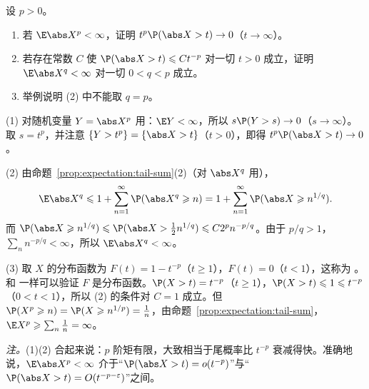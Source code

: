 \begin{workedexample}\label{we:expectation:moments-tails}
设 $p>0$。
\begin{enumerate}
\item 若 $\E\abs X^p<\infty$，证明 $t^p\P(\abs X>t)\to0$（$t\to\infty$）。
\item 若存在常数 $C$ 使 $\P(\abs X>t)\leqslant Ct^{-p}$ 对一切 $t>0$ 成立，证明 $\E\abs X^q<\infty$ 对一切 $0<q<p$ 成立。
\item 举例说明 (2) 中不能取 $q=p$。
\end{enumerate}
\end{workedexample}
\begin{solution}
(1) 对随机变量 $Y=\abs X^p$ 用：$\E Y<\infty$，所以 $s\P(Y>s)\to0$（$s\to\infty$）。取 $s=t^p$，并注意 $\{Y>t^p\}=\{\abs X>t\}$（$t>0$），即得 $t^p\P(\abs X>t)\to0$。

(2) 由命题~\ref{prop:expectation:tail-sum}(2)（对 $\abs X^q$ 用），
\[
\E\abs X^q\leqslant1+\sum_{n=1}^\infty \P(\abs X^q\geqslant n)=1+\sum_{n=1}^\infty \P(\abs X\geqslant n^{1/q}).
\]
而 $\P(\abs X\geqslant n^{1/q})\leqslant \P(\abs X>\frac12n^{1/q})\leqslant C2^pn^{-p/q}$。由于 $p/q>1$，$\sum_nn^{-p/q}<\infty$，所以 $\E\abs X^q<\infty$。

(3) 取 $X$ 的分布函数为 $F(t)=1-t^{-p}$（$t\geqslant1$），$F(t)=0$（$t<1$），这称为 。和 一样可以验证 $F$ 是分布函数。$\P(X>t)=t^{-p}$（$t\geqslant1$），$\P(X>t)\leqslant1\leqslant t^{-p}$（$0<t<1$），所以 (2) 的条件对 $C=1$ 成立。但 $\P(X^p\geqslant n)=\P(X\geqslant n^{1/p})=\frac1n$，由命题~\ref{prop:expectation:tail-sum}，$\E X^p\geqslant\sum_n\frac1n=\infty$。

\emph{注。}(1)(2) 合起来说：$p$ 阶矩有限，大致相当于尾概率比 $t^{-p}$ 衰减得快。准确地说，$\E\abs X^p<\infty$ 介于“$\P(\abs X>t)=o(t^{-p})$”与“$\P(\abs X>t)=O(t^{-p-\varepsilon})$”之间。
\end{solution}

